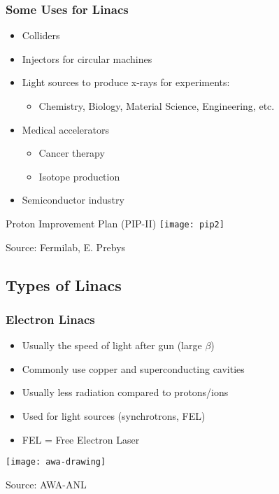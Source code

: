 \documentclass[professionalfonts,t]{beamer}
\begin{document}
\begin{frame}
\frametitle{Some Uses for Linacs}
\vspace{-1em}
\begin{minipage}{0.45\textwidth}
	\begin{itemize}
		\item Colliders 
		\item Injectors for circular machines
		\item Light sources to produce x-rays for experiments:
		\begin{itemize}
			\item Chemistry, Biology, Material Science, Engineering, etc.
		\end{itemize}
		\item Medical accelerators 
		\begin{itemize}
			\item Cancer therapy 
			\item Isotope production
		\end{itemize}
		\item Semiconductor industry
	\end{itemize}
\end{minipage}\hfill
\begin{minipage}{0.5\textwidth}
	\centering
	\vspace{-1.5em}
	
	\small Proton Improvement Plan (PIP-II)
	\texttt{[image: pip2]}
	
	\vspace{-0.25em}
	Source: Fermilab, E. Prebys
\end{minipage}
\end{frame}


\subsection{Types of Linacs}
\begin{frame}[containsverbatim]
\frametitle{Electron Linacs}
\begin{itemize}
	\item Usually the speed of light after gun (large $\beta$)
	\item Commonly use copper and superconducting cavities
	\item Usually less radiation compared to protons/ions
	\item Used for light sources (synchrotrons, FEL)
	\item FEL = Free Electron Laser
\end{itemize}

\texttt{[image: awa-drawing]}

\hfill Source: AWA-ANL
\end{frame}
\end{document}
